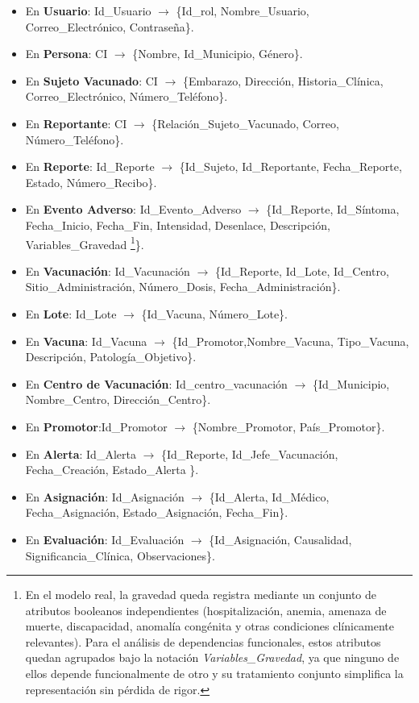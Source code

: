 \begin{itemize}
    \item En \textbf{Usuario}: Id\_Usuario $\rightarrow$ \{Id\_rol, Nombre\_Usuario, Correo\_Electrónico, Contraseña\}.
    \item En \textbf{Persona}: CI $\rightarrow$ \{Nombre, Id\_Municipio, Género\}.
    \item En \textbf{Sujeto Vacunado}: CI $\rightarrow$ \{Embarazo, Dirección, Historia\_Clínica, Correo\_Electrónico, Número\_Teléfono\}.
    \item En \textbf{Reportante}: CI $\rightarrow$ \{Relación\_Sujeto\_Vacunado, Correo, Número\_Teléfono\}.
    \item En \textbf{Reporte}: Id\_Reporte $\rightarrow$ \{Id\_Sujeto, Id\_Reportante, Fecha\_Reporte, Estado, Número\_Recibo\}.
    \item En \textbf{Evento Adverso}: Id\_Evento\_Adverso $\rightarrow$ \{Id\_Reporte, Id\_Síntoma, Fecha\_Inicio, Fecha\_Fin, Intensidad, Desenlace, Descripción, Variables\_Gravedad \footnote{En el modelo real, la gravedad queda registra mediante un conjunto de atributos booleanos independientes (hospitalización, anemia, amenaza de muerte, discapacidad, anomalía congénita y otras condiciones clínicamente relevantes). Para el análisis de dependencias funcionales, estos atributos quedan agrupados bajo la notación \textit{Variables\_Gravedad}, ya que ninguno de ellos depende funcionalmente de otro y su tratamiento conjunto simplifica la representación sin pérdida de rigor.}\}.
    \item En \textbf{Vacunación}: Id\_Vacunación $\rightarrow$ \{Id\_Reporte, Id\_Lote, Id\_Centro, Sitio\_Administración, Número\_Dosis, Fecha\_Administración\}.
    \item En \textbf{Lote}: Id\_Lote $\rightarrow$ \{Id\_Vacuna, Número\_Lote\}.
    \item En \textbf{Vacuna}: Id\_Vacuna $\rightarrow$ \{Id\_Promotor,Nombre\_Vacuna, Tipo\_Vacuna, Descripción, Patología\_Objetivo\}.
    \item En \textbf{Centro de Vacunación}: Id\_centro\_vacunación $\rightarrow$ \{Id\_Municipio, Nombre\_Centro, Dirección\_Centro\}.
    \item En \textbf{Promotor}:Id\_Promotor $\rightarrow$ \{Nombre\_Promotor, País\_Promotor\}.
    \item En \textbf{Alerta}: Id\_Alerta $\rightarrow$ \{Id\_Reporte, Id\_Jefe\_Vacunación, Fecha\_Creación, Estado\_Alerta \}.
    \item En \textbf{Asignación}: Id\_Asignación $\rightarrow$ \{Id\_Alerta, Id\_Médico, Fecha\_Asignación, Estado\_Asignación, Fecha\_Fin\}.
    \item En \textbf{Evaluación}: Id\_Evaluación $\rightarrow$ \{Id\_Asignación, Causalidad, Significancia\_Clínica, Observaciones\}.
\end{itemize}

